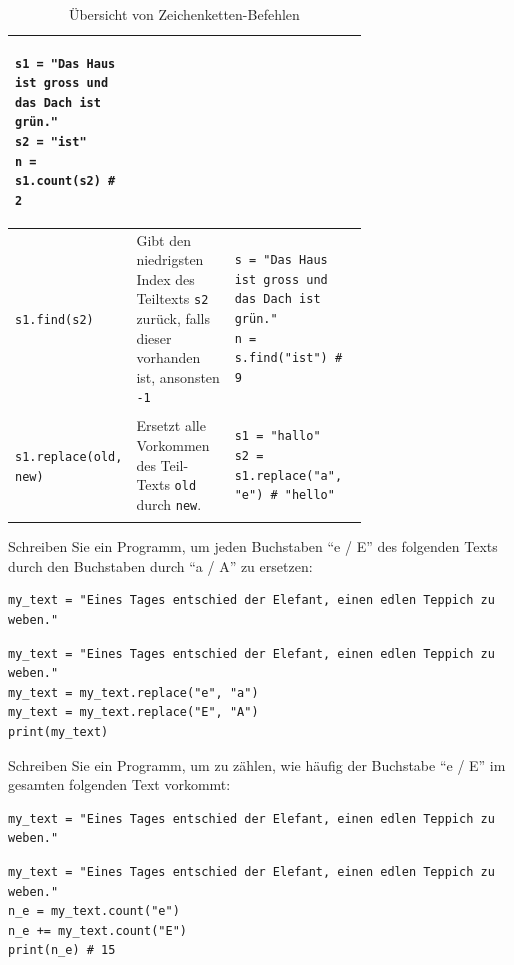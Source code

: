 \begin{table}[H]
\begin{tabular}{l|p{0.3\linewidth}|p{0.4\linewidth}}
\begin{minipage}{\linewidth}
\begin{lstlisting}[numbers=none]
s1 = "Das Haus ist gross und das Dach ist grün."
s2 = "ist"
n = s1.count(s2) # 2
\end{lstlisting}
\end{minipage}\\\midrule
\lstinline|s1.find(s2)| & Gibt den niedrigsten Index des Teiltexts \lstinline|s2| zurück, falls dieser vorhanden ist, ansonsten \lstinline|-1| & \begin{minipage}{\linewidth}
\begin{lstlisting}[numbers=none]
s = "Das Haus ist gross und das Dach ist grün."
n = s.find("ist") # 9
\end{lstlisting}
\end{minipage}\\\midrule
\lstinline|s1.replace(old, new)| & Ersetzt alle Vorkommen des Teil-Texts \lstinline|old| durch \lstinline|new|. & \begin{minipage}{\linewidth}
\begin{lstlisting}[numbers=none]
s1 = "hallo"
s2 = s1.replace("a", "e") # "hello"
\end{lstlisting}
\end{minipage}
\end{tabular}
\caption{Übersicht von Zeichenketten-Befehlen}
\label{tab:string-op}
\end{table}
\begin{myexercise}
Schreiben Sie ein Programm, um jeden Buchstaben ``e / E'' des folgenden Texts durch den Buchstaben durch ``a / A'' zu ersetzen:

\begin{lstlisting}
my_text = "Eines Tages entschied der Elefant, einen edlen Teppich zu weben."
\end{lstlisting}

\begin{myanswer}
\begin{lstlisting}
my_text = "Eines Tages entschied der Elefant, einen edlen Teppich zu weben."
my_text = my_text.replace("e", "a")
my_text = my_text.replace("E", "A")
print(my_text)
\end{lstlisting}
\end{myanswer}
\end{myexercise}

\begin{myexercise}
Schreiben Sie ein Programm, um zu zählen, wie häufig der Buchstabe ``e / E'' im gesamten folgenden Text vorkommt:

\begin{lstlisting}
my_text = "Eines Tages entschied der Elefant, einen edlen Teppich zu weben."
\end{lstlisting}

\begin{myanswer}
\begin{lstlisting}
my_text = "Eines Tages entschied der Elefant, einen edlen Teppich zu weben."
n_e = my_text.count("e")
n_e += my_text.count("E")
print(n_e) # 15
\end{lstlisting}
\end{myanswer}
\end{myexercise}


